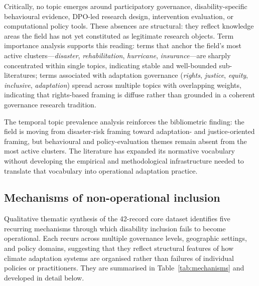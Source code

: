 \documentclass[12pt,a4paper]{article}
\begin{document}
Critically, no topic emerges around participatory governance, disability-specific behavioural evidence, DPO-led research design, intervention evaluation, or computational policy tools. These absences are structural: they reflect knowledge areas the field has not yet constituted as legitimate research objects. Term importance analysis supports this reading: terms that anchor the field's most active clusters---\textit{disaster}, \textit{rehabilitation}, \textit{hurricane}, \textit{insurance}---are sharply concentrated within single topics, indicating stable and well-bounded sub-literatures; terms associated with adaptation governance (\textit{rights}, \textit{justice}, \textit{equity}, \textit{inclusive}, \textit{adaptation}) spread across multiple topics with overlapping weights, indicating that rights-based framing is diffuse rather than grounded in a coherent governance research tradition.

The temporal topic prevalence analysis reinforces the bibliometric finding: the field is moving from disaster-risk framing toward adaptation- and justice-oriented framing, but behavioural and policy-evaluation themes remain absent from the most active clusters. The literature has expanded its normative vocabulary without developing the empirical and methodological infrastructure needed to translate that vocabulary into operational adaptation practice.

\subsection*{Mechanisms of non-operational inclusion}

Qualitative thematic synthesis of the 42-record core dataset identifies five recurring mechanisms through which disability inclusion fails to become operational. Each recurs across multiple governance levels, geographic settings, and policy domains, suggesting that they reflect structural features of how climate adaptation systems are organised rather than failures of individual policies or practitioners. They are summarised in Table~\ref{tab:mechanisms} and developed in detail below.
\end{document}
